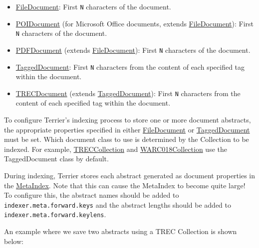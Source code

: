 \begin{itemize}
\tightlist
\item
  \href{javadoc/org/terrier/indexing/FileDocument.html}{FileDocument}:
  First \texttt{N} characters of the document.
\item
  \href{javadoc/org/terrier/indexing/POIDocument.html}{POIDocument} (for
  Microsoft Office documents, extends
  \href{javadoc/org/terrier/indexing/FileDocument.html}{FileDocument}):
  First \texttt{N} characters of the document.
\item
  \href{javadoc/org/terrier/indexing/PDFDocument.html}{PDFDocument}
  (extends
  \href{javadoc/org/terrier/indexing/FileDocument.html}{FileDocument}):
  First \texttt{N} characters of the document.
\item
  \href{javadoc/org/terrier/indexing/TaggedDocument.html}{TaggedDocument}:
  First \texttt{N} characters from the content of each specified tag
  within the document.
\item
  \href{javadoc/org/terrier/indexing/TRECDocument.html}{TRECDocument}
  (extends
  \href{javadoc/org/terrier/indexing/TaggedDocument.html}{TaggedDocument}):
  First \texttt{N} characters from the content of each specified tag
  within the document.
\end{itemize}

To configure Terrier's indexing process to store one or more document
abstracts, the appropriate properties specified in either
\href{javadoc/org/terrier/indexing/FileDocument.html}{FileDocument} or
\href{javadoc/org/terrier/indexing/TaggedDocument.html}{TaggedDocument}
must be set. Which document class to use is determined by the Collection
to be indexed. For example,
\href{javadoc/org/terrier/indexing/TRECCollection.html}{TRECCollection}
and
\href{javadoc/org/terrier/indexing/WARC018Collection.html}{WARC018Collection}
use the TaggedDocument class by default.

During indexing, Terrier stores each abstract generated as document
properties in the
\href{javadoc/org/terrier/structures/MetaIndex.html}{MetaIndex}. Note
that this can cause the MetaIndex to become quite large! To configure
this, the abstract names should be added to
\texttt{indexer.meta.forward.keys} and the abstract lengths should be
added to \texttt{indexer.meta.forward.keylens}.

An example where we save two abstracts using a TREC Collection is shown
below:

